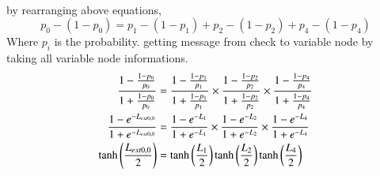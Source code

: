 \documentclass[journal,12pt,twocolumn]{IEEEtran}
\begin{document}
\begin{enumerate}
\begin{align*}
\end{align*}
by rearranging above equations,
\begin{equation}
p_0 - (1-p_0) = p_1 -(1-p_1) + p_2 - (1-p_2) + p_4 -(1- p_4)
\end{equation}
Where $p_i$ is the probability. getting message from check to variable node by taking all variable node informations.
\begin{align}
\frac{1-\frac{1-p_0}{p_0}}{1+\frac{1-p_0}{p_0}} & = \frac{1-\frac{1-p_1}{p_1}}{1+\frac{1-p_1}{p_1}} \times \frac{1-\frac{1-p_2}{p_2}}{1+\frac{1-p_2}{p_2}} \times \frac{1-\frac{1-p_4}{p_4}}{1+\frac{1-p_4}{p_4}}\\
\frac{1-e^{-L_{ext0,0}}}{1+e^{-L_{ext0,0}}} &=\frac{1-e^{-L_{1}}}{1+e^{-L_{1}}}\times \frac{1-e^{-L_{2}}}{1+e^{-L_{2}}} \times \frac{1-e^{-L_{4}}}{1+e^{-L_{4}}}\\ \nonumber
\tanh \left(\frac{L_{ext0,0}}{2}\right)& =\tanh \left(\frac{L_{1}}{2}\right)\tanh \left(\frac{L_{2}}{2}\right) \tanh \left(\frac{L_{4}}{2}\right) 
\end{align}


\end{enumerate}
\end{document}
